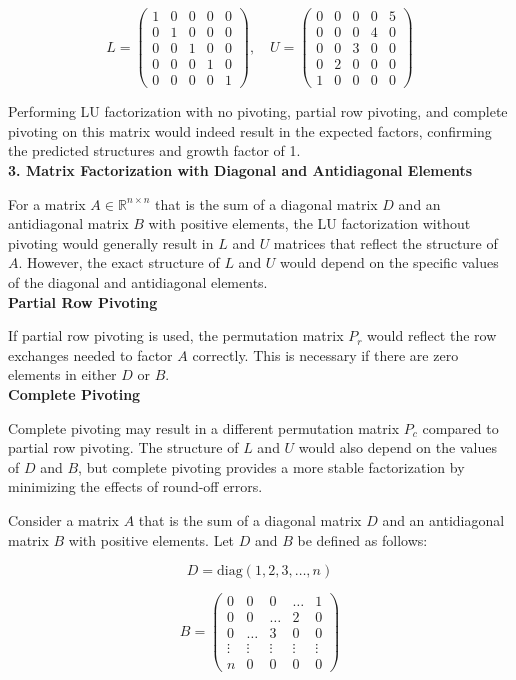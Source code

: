 \documentclass{article}
\begin{document}
\[ L = \begin{pmatrix} 1 & 0 & 0 & 0 & 0 \\ 0 & 1 & 0 & 0 & 0 \\ 0 & 0 & 1 & 0 & 0 \\ 0 & 0 & 0 & 1 & 0 \\ 0 & 0 & 0 & 0 & 1 \end{pmatrix}, \quad U = \begin{pmatrix} 0 & 0 & 0 & 0 & 5 \\ 0 & 0 & 0 & 4 & 0 \\ 0 & 0 & 3 & 0 & 0 \\ 0 & 2 & 0 & 0 & 0 \\ 1 & 0 & 0 & 0 & 0 \end{pmatrix} \]

Performing LU factorization with no pivoting, partial row pivoting, and complete pivoting on this matrix would indeed result in the expected factors, confirming the predicted structures and growth factor of 1.
\\
\textbf{3. Matrix Factorization with Diagonal and Antidiagonal Elements}

For a matrix $A \in \mathbb{R}^{n \times n}$ that is the sum of a diagonal matrix $D$ and an antidiagonal matrix $B$ with positive elements, the LU factorization without pivoting would generally result in $L$ and $U$ matrices that reflect the structure of $A$. However, the exact structure of $L$ and $U$ would depend on the specific values of the diagonal and antidiagonal elements.
\\
\textbf{Partial Row Pivoting}

If partial row pivoting is used, the permutation matrix $P_r$ would reflect the row exchanges needed to factor $A$ correctly. This is necessary if there are zero elements in either $D$ or $B$.
\\
\textbf{Complete Pivoting}

Complete pivoting may result in a different permutation matrix $P_c$ compared to partial row pivoting. The structure of $L$ and $U$ would also depend on the values of $D$ and $B$, but complete pivoting provides a more stable factorization by minimizing the effects of round-off errors.

Consider a matrix \(A\) that is the sum of a diagonal matrix \(D\) and an antidiagonal matrix \(B\) with positive elements. Let \(D\) and \(B\) be defined as follows:

\[ D = \text{diag}(1, 2, 3, \ldots, n) \]

\[ B = \begin{pmatrix} 0 & 0 & 0 & \ldots & 1 \\ 0 & 0 & \ldots & 2 & 0 \\ 0 & \ldots & 3 & 0 & 0 \\ \vdots & \vdots & \vdots & \vdots & \vdots \\ n & 0 & 0 & 0 & 0 \end{pmatrix} \]
\end{document}
